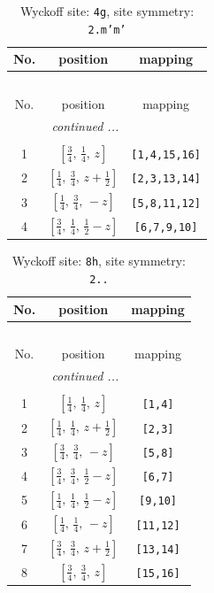 \documentclass[fleqn,8pt]{jsarticle}
\begin{document}
\renewcommand{\arraystretch}{1.2}
\begin{longtable}{ccc}
\caption{Wyckoff site: {\tt 4g}, site symmetry: {\tt 2.m'm'}}
 \\
 \hline \hline
No. & position & mapping \\ \hline \endfirsthead

\multicolumn{2}{l}{\tablename\ \thetable{}} \\
 \hline \hline
No. & position & mapping \\ \hline \endhead

 \hline \hline
\multicolumn{2}{r}{\footnotesize\it continued ...} \\ \endfoot

 \hline \hline
\multicolumn{2}{r}{} \\ \endlastfoot

1 & $\left[ \frac{3}{4},\, \frac{1}{4},\, z \right]$ & {\tt [1,4,15,16]} \\ \hline
2 & $\left[ \frac{1}{4},\, \frac{3}{4},\, z + \frac{1}{2} \right]$ & {\tt [2,3,13,14]} \\ \hline
3 & $\left[ \frac{1}{4},\, \frac{3}{4},\, - z \right]$ & {\tt [5,8,11,12]} \\ \hline
4 & $\left[ \frac{3}{4},\, \frac{1}{4},\, \frac{1}{2} - z \right]$ & {\tt [6,7,9,10]} \\
\end{longtable}
\renewcommand{\arraystretch}{1.2}
\begin{longtable}{ccc}
\caption{Wyckoff site: {\tt 8h}, site symmetry: {\tt 2..}}
 \\
 \hline \hline
No. & position & mapping \\ \hline \endfirsthead

\multicolumn{2}{l}{\tablename\ \thetable{}} \\
 \hline \hline
No. & position & mapping \\ \hline \endhead

 \hline \hline
\multicolumn{2}{r}{\footnotesize\it continued ...} \\ \endfoot

 \hline \hline
\multicolumn{2}{r}{} \\ \endlastfoot

1 & $\left[ \frac{1}{4},\, \frac{1}{4},\, z \right]$ & {\tt [1,4]} \\ \hline
2 & $\left[ \frac{1}{4},\, \frac{1}{4},\, z + \frac{1}{2} \right]$ & {\tt [2,3]} \\ \hline
3 & $\left[ \frac{3}{4},\, \frac{3}{4},\, - z \right]$ & {\tt [5,8]} \\ \hline
4 & $\left[ \frac{3}{4},\, \frac{3}{4},\, \frac{1}{2} - z \right]$ & {\tt [6,7]} \\ \hline
5 & $\left[ \frac{1}{4},\, \frac{1}{4},\, \frac{1}{2} - z \right]$ & {\tt [9,10]} \\ \hline
6 & $\left[ \frac{1}{4},\, \frac{1}{4},\, - z \right]$ & {\tt [11,12]} \\ \hline
7 & $\left[ \frac{3}{4},\, \frac{3}{4},\, z + \frac{1}{2} \right]$ & {\tt [13,14]} \\ \hline
8 & $\left[ \frac{3}{4},\, \frac{3}{4},\, z \right]$ & {\tt [15,16]} \\
\end{longtable}
\end{document}
